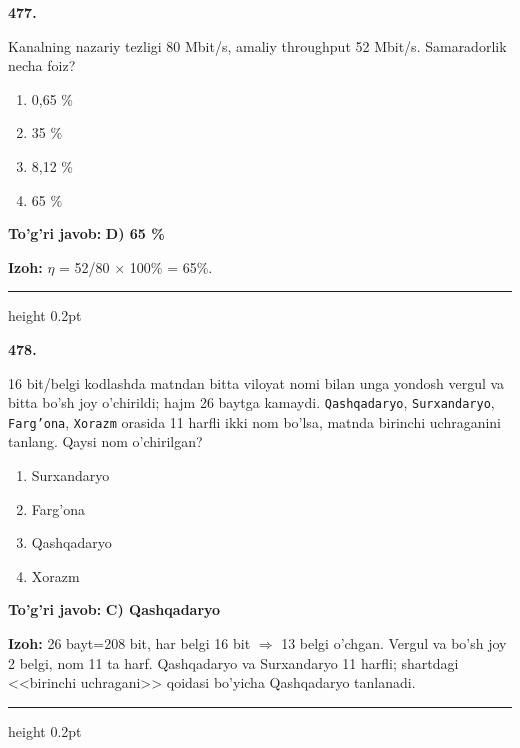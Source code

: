 \documentclass[10pt,a4paper,oneside]{article}
\begin{document}
\noindent\textbf{\color{ink}477.}
\par
Kanalning nazariy tezligi 80 Mbit/s, amaliy throughput 52 Mbit/s. Samaradorlik necha foiz?
\begin{enumerate}[label=\Alph*),leftmargin=9mm]
\item 0,65 \%
\item 35 \%
\item 8,12 \%
\item 65 \%
\end{enumerate}
\begin{tcolorbox}[enhanced,breakable,colback=teal!4,colframe=teal!50!black,boxrule=0.5pt,arc=1.1mm,left=3mm,right=3mm,top=1.7mm,bottom=1.7mm,before skip=2mm,after skip=2mm]
\textbf{\color{teal}To'g'ri javob:} \textbf{D) 65 \%}
\par\smallskip
\textbf{Izoh:} \ensuremath{\eta} = 52/80 \ensuremath{\times} 100\% = 65\%.
\end{tcolorbox}
\vspace{2mm}\hrule height 0.2pt \vspace{3mm}

\noindent\textbf{\color{ink}478.}
\par
16 bit/belgi kodlashda matndan bitta viloyat nomi bilan unga yondosh vergul va bitta bo'sh joy o'chirildi; hajm 26 baytga kamaydi. \texttt{Qashqadaryo}, \texttt{Surxandaryo}, \texttt{Farg'ona}, \texttt{Xorazm} orasida 11 harfli ikki nom bo'lsa, matnda birinchi uchraganini tanlang. Qaysi nom o'chirilgan?
\begin{enumerate}[label=\Alph*),leftmargin=9mm]
\item Surxandaryo
\item Farg'ona
\item Qashqadaryo
\item Xorazm
\end{enumerate}
\begin{tcolorbox}[enhanced,breakable,colback=teal!4,colframe=teal!50!black,boxrule=0.5pt,arc=1.1mm,left=3mm,right=3mm,top=1.7mm,bottom=1.7mm,before skip=2mm,after skip=2mm]
\textbf{\color{teal}To'g'ri javob:} \textbf{C) Qashqadaryo}
\par\smallskip
\textbf{Izoh:} 26 bayt=208 bit, har belgi 16 bit \ensuremath{\Rightarrow} 13 belgi o'chgan. Vergul va bo'sh joy 2 belgi, nom 11 ta harf. Qashqadaryo va Surxandaryo 11 harfli; shartdagi <<birinchi uchragani>> qoidasi bo'yicha Qashqadaryo tanlanadi.
\end{tcolorbox}
\vspace{2mm}\hrule height 0.2pt \vspace{3mm}
\end{document}
